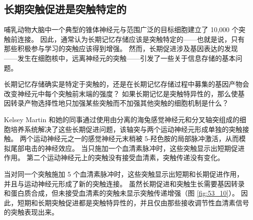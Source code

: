 \subsection{长期突触促进是突触特定的}
哺乳动物大脑中一个典型的锥体神经元与范围广泛的目标细胞建立了 10,000 个突触前连接。 因此，通常认为长期记忆存储应该是突触特定的——也就是说，只有那些积极参与学习的突触应该得到增强。 然而，长期促进涉及基因表达的发现——发生在细胞核中，远离神经元的突触——引发了一些关于信息存储的基本问题。

长期记忆存储确实是特定于突触的，还是在长期记忆存储过程中募集的基因产物会改变神经元中每个突触前末端的强度？ 如果长期记忆是突触特异性的，那么使基因转录产物选择性地只加强某些突触而不加强其他突触的细胞机制是什么？

Kelsey Martin 和她的同事通过使用由分离的海兔感觉神经元和分叉轴突组成的细胞培养系统解决了这些长期促进问题，该轴突与两个运动神经元形成单独的突触接触。 两个运动神经元之一的感觉神经元末梢被 5-羟色胺的局部脉冲激活，从而模拟尾部电击的神经效应。 当只施加一个血清素脉冲时，这些突触显示出短期促进作用。 第二个运动神经元上的突触没有接受血清素，突触传递没有变化。

当对同一个突触施加 5 个血清素脉冲时，这些突触显示出短期和长期促进作用，并且与运动神经元形成了新的突触连接。 虽然长期促进和突触生长需要基因转录和蛋白质合成，但未接受血清素的突触未显示突触传递增强（图 \ref{fig:53_10}）。 因此，短期和长期突触促进都是突触特异性的，并且仅由那些接收调节性血清素信号的突触表现出来。

